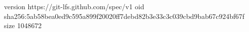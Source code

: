 version https://git-lfs.github.com/spec/v1
oid sha256:5ab58bea0ed9c595a899f20020ff7debd82b3e33c3c039cbd9bab67c924bf67f
size 1048672
